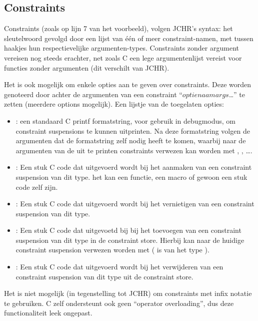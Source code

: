 \subsection{Constraints}

Constraints (zoals op lijn 7 van het voorbeeld), volgen JCHR's syntax: het  sleutelwoord gevolgd door een lijst van \'e\'en of meer constraint-namen, met tussen haakjes hun respectievelijke argumenten-types. Constraints zonder argument vereisen nog steeds \code{()} erachter, net zoals C een lege argumentenlijst vereist voor functies zonder argumenten (dit verschilt van JCHR).

Het is ook mogelijk om enkele opties aan te geven over constraints. Deze worden genoteerd door achter de argumenten van een constraint ``$optienaam$\code{,}$args$\ldots\code{)}'' te zetten (meerdere options mogelijk). Een lijstje van de
toegelaten opties: \begin{itemize}
  \item {}: een standaard C printf formatstring, voor gebruik in debugmodus, om constraint suspensions te kunnen
    uitprinten. Na deze formatstring volgen de argumenten dat de formatstring zelf nodig heeft te komen, waarbij naar de
    argumenten van de uit te printen constraints verwezen kan worden met , , \ldots. 
  \item {}: Een stuk C code dat uitgevoerd wordt bij het aanmaken van een constraint suspension van dit type.
    het kan een functie, een macro of gewoon een stuk code zelf zijn.
  \item {}: Een stuk C code dat uitgevoerd wordt bij het vernietigen van een constraint suspension van dit type. 
  \item {}: Een stuk C code dat uitgevoetd bij bij het toevoegen van een constraint suspension van dit type in de
    constraint store. Hierbij kan naar de huidige constraint suspension verwezen worden met  ( is van het type ).
  \item {}: Een stuk C code dat uitgevoerd wordt bij het verwijderen van een constraint suspension van dit type
    uit de constraint store.
\end{itemize}

Het is niet mogelijk (in tegenstelling tot JCHR) om constraints met infix notatie te gebruiken. C zelf ondersteunt ook geen ``operator overloading'', dus deze functionaliteit leek ongepast.

